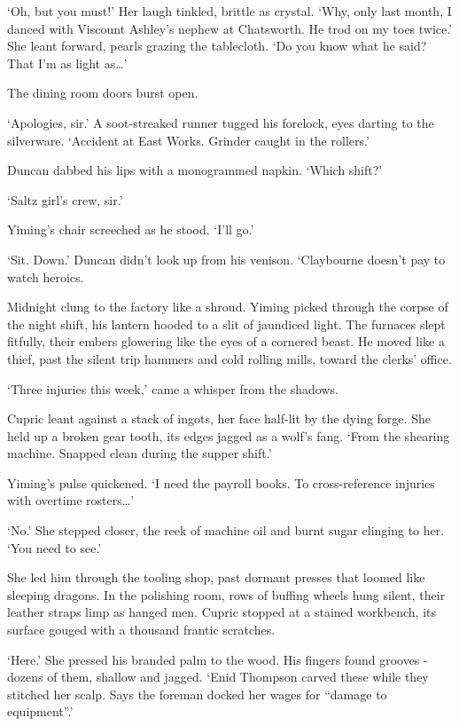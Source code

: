 `Oh, but you must!' Her laugh tinkled, brittle as crystal. `Why, only last month, I danced with Viscount Ashley's nephew at Chatsworth. He trod on my toes twice.' She leant forward, pearls grazing the tablecloth. `Do you know what he said? That I'm as light as\dots'

The dining room doors burst open.

`Apologies, sir.' A soot-streaked runner tugged his forelock, eyes darting to the silverware. `Accident at East Works. Grinder caught in the rollers.'

Duncan dabbed his lips with a monogrammed napkin. `Which shift?'

`Saltz girl's crew, sir.'

Yiming's chair screeched as he stood. `I'll go.'

`Sit. Down.' Duncan didn't look up from his venison. `Claybourne doesn't pay to watch heroics.

 Midnight clung to the factory like a shroud. Yiming picked through the corpse of the night shift, his lantern hooded to a slit of jaundiced light. The furnaces slept fitfully, their embers glowering like the eyes of a cornered beast. He moved like a thief, past the silent trip hammers and cold rolling mills, toward the clerks' office.

`Three injuries this week,' came a whisper from the shadows.

Cupric leant against a stack of ingots, her face half-lit by the dying forge. She held up a broken gear tooth, its edges jagged as a wolf's fang. `From the shearing machine. Snapped clean during the supper shift.'

Yiming's pulse quickened. `I need the payroll books. To cross-reference injuries with overtime rosters\dots'

`No.' She stepped closer, the reek of machine oil and burnt sugar clinging to her. `You need to see.'

She led him through the tooling shop, past dormant presses that loomed like sleeping dragons. In the polishing room, rows of buffing wheels hung silent, their leather straps limp as hanged men. Cupric stopped at a stained workbench, its surface gouged with a thousand frantic scratches.

`Here.' She pressed his branded palm to the wood. His fingers found grooves - dozens of them, shallow and jagged. `Enid Thompson carved these while they stitched her scalp. Says the foreman docked her wages for “damage to equipment”.'

